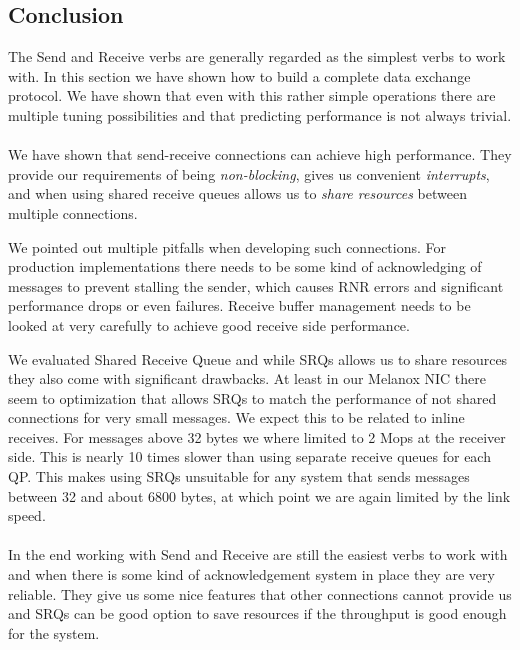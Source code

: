 \subsection{Conclusion}

The Send and Receive verbs are generally regarded as the simplest verbs to work with. In this section we have shown how to
build a complete data exchange protocol. We have shown that even with this rather simple operations there are multiple tuning
possibilities and that predicting performance  is not always trivial.

\paragraph{} We have shown that send-receive connections can achieve high performance. They provide our requirements of being
\emph{non-blocking}, gives us convenient \emph{interrupts}, and when using shared receive queues allows us to 
\emph{share resources} between multiple  connections.

We pointed out multiple pitfalls when developing such connections. For production implementations there needs
to be some kind of acknowledging of messages to prevent stalling the sender, which causes RNR errors and significant 
performance drops or even failures. Receive buffer management needs to be looked at very carefully to achieve good receive
side performance.

We evaluated Shared Receive Queue and while SRQs allows us to share resources they also come with significant drawbacks. At
least in our Melanox NIC there seem to optimization that allows SRQs to match the performance of not shared connections for
very small messages. We expect this to be related to inline receives. For messages above 32 bytes we where limited to 
2 Mops at the receiver side. This is nearly 10 times slower than using separate receive queues for each QP. This makes 
using SRQs unsuitable for any system that sends messages between 32 and about 6800 bytes, at which point we are again limited 
by the link speed.


\paragraph{} In the end working with Send and Receive are still the easiest verbs to work with and when there is some kind of
acknowledgement system in place they are very reliable. They give us some nice features that other connections cannot provide
us and SRQs can be good option to save resources if the throughput is good enough for the system.

